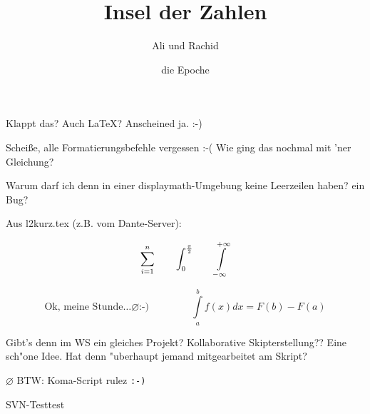 \documentclass{scrartcl}
\title{Insel der Zahlen}
\author{Ali und Rachid}
\date{die Epoche}
\begin{document}

\maketitle

Klappt das? Auch \LaTeX{}? Anscheined ja. :-)

Scheiße, alle Formatierungsbefehle vergessen :-(
\newline
Wie ging das nochmal mit 'ner Gleichung?

Warum darf ich denn in einer displaymath-Umgebung keine Leerzeilen haben? ein Bug?

Aus l2kurz.tex (z.B. vom Dante-Server):

\begin{displaymath}
\sum_{i=1}^{n} \qquad
\int_{0}^{\frac{\pi}{2}} \qquad
\int \limits_{-\infty}^{+\infty}\\
\end{displaymath}

\begin{displaymath}
\textrm{Ok, meine Stunde}\ldots \varnothing \texttt{:-)} \qquad \  \qquad
\int \limits_{a}^{b} f(x) d x = F(b) - F(a)
\end{displaymath}

Gibt's denn im WS ein gleiches Projekt? Kollaborative Skipterstellung?? Eine sch"one Idee. Hat denn "uberhaupt jemand mitgearbeitet am Skript?

$ \varnothing $
BTW: Koma-Script rulez \texttt{:-)}

\begin{xy}
\end{xy}

SVN-Testtest
\end{document}
